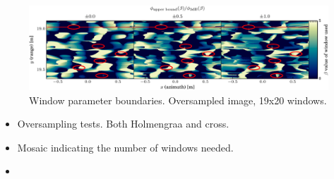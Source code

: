 \documentclass[10pt,journal,draftclsnofoot,onecolumn]{IEEEtran}
\let\MYoriglatexcaption\caption               %
\renewcommand{\caption}[2][\relax]{\MYoriglatexcaption[#2]{#2}}
\newcommand\1{\vec 1}
\begin{document}
\begin{figure}%
\includegraphics[width=\textwidth]{gfx/oversampling_mosaic_bounds_lca_windows_beta.pdf}%
\caption{Window parameter boundaries. Oversampled image, 19x20 windows.}\label{oversampling_mosaic_bounds}
\end{figure}




\begin{itemize}
\item Oversampling tests. Both Holmengraa and cross.
\item Mosaic indicating the number of windows needed.
\item 
\end{itemize}



\end{document}
